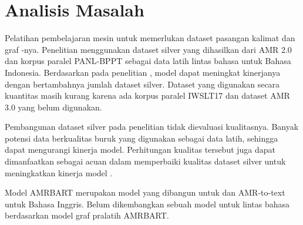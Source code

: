 \section{Analisis Masalah}

Pelatihan pembelajaran mesin untuk  \amrparsing{} memerlukan dataset  pasangan kalimat dan graf \AMR{}-nya.
Penelitian \textcite{putra2022} menggunakan dataset silver yang dihasilkan dari AMR 2.0 dan korpus paralel PANL-BPPT sebagai data latih \amrparsing{} lintas bahasa untuk Bahasa Indonesia.
Berdasarkan pada penelitian \textcite{lee2022}, model \amrparsing{} dapat meningkat kinerjanya dengan bertambahnya jumlah dataset silver.
Dataset yang digunakan \textcite{putra2022} secara kuantitas masih kurang karena ada korpus paralel IWSLT17 dan dataset AMR 3.0 yang belum digunakan.

Pembangunan dataset silver pada penelitian \textcite{putra2022} tidak dievaluasi kualitasnya.
Banyak potensi  data berkualitas buruk yang digunakan sebagai data latih, sehingga dapat mengurangi kinerja model.
Perhitungan kualitas tersebut juga dapat dimanfaatkan sebagai acuan dalam memperbaiki kualitas dataset silver untuk meningkatkan kinerja model \amrparsing{}.

Model \gls{AMRBART}  merupakan model \sota{} yang dibangun untuk \amrparsing{} dan AMR-to-text untuk Bahasa Inggris.
Belum dikembangkan sebuah model \amrparsing{} untuk lintas bahasa berdasarkan model graf pralatih \gls{AMRBART}.
